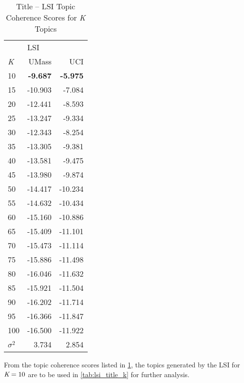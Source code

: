 \documentclass[letterpaper,12pt]{article}
\begin{document}
\begin{table}
	\caption{\label{tab:lsi_title_tc} Title -- LSI Topic Coherence Scores for \emph{K} Topics}
	\begin{center}
		\begin{tabular}{lrr}
			\toprule
			{} & \multicolumn{2}{l}{LSI} \\
			\emph{K} &   UMass &     UCI \\
			\midrule
			10  &  \textbf{-9.687} &  \textbf{-5.975} \\
			15  & -10.903 &  -7.084 \\
			20  & -12.441 &  -8.593 \\
			25  & -13.247 &  -9.334 \\
			30  & -12.343 &  -8.254 \\
			35  & -13.305 &  -9.381 \\
			40  & -13.581 &  -9.475 \\
			45  & -13.980 &  -9.874 \\
			50  & -14.417 & -10.234 \\
			55  & -14.632 & -10.434 \\
			60  & -15.160 & -10.886 \\
			65  & -15.409 & -11.101 \\
			70  & -15.473 & -11.114 \\
			75  & -15.886 & -11.498 \\
			80  & -16.046 & -11.632 \\
			85  & -15.921 & -11.504 \\
			90  & -16.202 & -11.714 \\
			95  & -16.366 & -11.847 \\
			100 & -16.500 & -11.922 \\
			\midrule
			$\sigma^2$ & 3.734 & 2.854 \\
			\bottomrule
			\end{tabular}
	\end{center}
\end{table}



\newpage

From the topic coherence scores listed in \ref{tab:lsi_title_tc}, the topics generated by the LSI for $\emph{K} = 10$
are to be used in \ref{tab:lsi_title_k} for further analysis.
\end{document}
